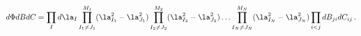 \begin{equation}
d\Phi dB dC = \prod_{I}d\la_I \prod_{I_1\neq J_1}^{M_1} (\la_{I_1}^2 -\la%
_{J_1}^2) \prod_{I_2\neq J_2}^{M_2} (\la_{I_2}^2 -\la_{J_2}^2) \ldots
\prod_{I_N\neq J_N}^{M_N} (\la_{I_N}^2 -\la_{J_N}^2) \prod_{i< j}dB_{ji}
dC_{ij} \, .  \label{MES}
\end{equation}

